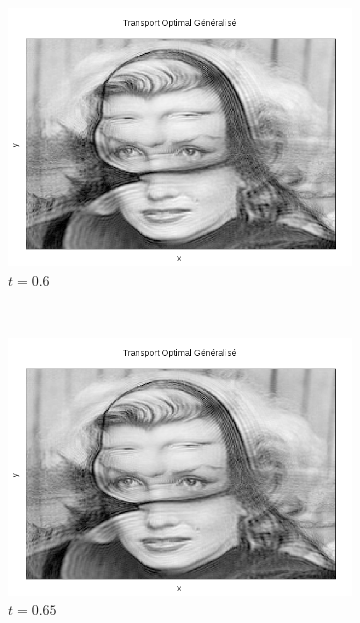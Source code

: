 \documentclass[a4paper,12pt]{article}
\begin{document}
\begin{figure}[!h]
\begin{subfigure}[b]{0.23\linewidth}
\includegraphics[width=\linewidth]{img/2DMorphing/T_00133.png}
\caption*{$t=0.6$}
\end{subfigure}
~
\begin{subfigure}[b]{0.23\linewidth}
\includegraphics[width=\linewidth]{img/2DMorphing/T_00144.png}
\caption*{$t=0.65$}
\end{subfigure}
~
\begin{subfigure}[b]{0.23\linewidth}

\end{subfigure}
\end{figure}
\end{document}
